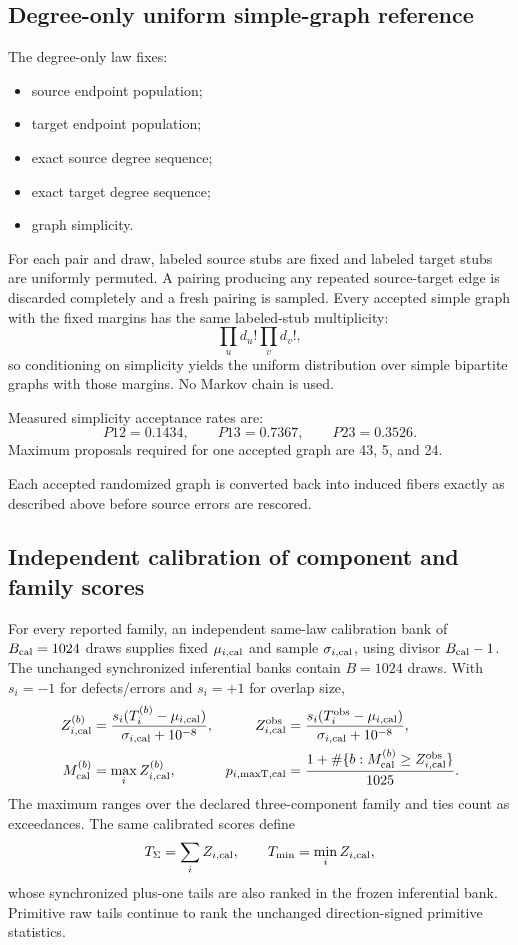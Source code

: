 \documentclass[11pt]{article}
\begin{document}
\subsection{Degree-only uniform simple-graph reference}

The degree-only law fixes:
\begin{itemize}[leftmargin=2em]
\item source endpoint population;
\item target endpoint population;
\item exact source degree sequence;
\item exact target degree sequence;
\item graph simplicity.
\end{itemize}

For each pair and draw, labeled source stubs are fixed and labeled target stubs are uniformly permuted. A pairing producing any repeated source-target edge is discarded completely and a fresh pairing is sampled. Every accepted simple graph with the fixed margins has the same labeled-stub multiplicity:
\[
\prod_u d_u!\prod_v d_v!,
\]
so conditioning on simplicity yields the uniform distribution over simple bipartite graphs with those margins. No Markov chain is used.

Measured simplicity acceptance rates are:
\[
P12=0.1434,\qquad
P13=0.7367,\qquad
P23=0.3526.
\]
Maximum proposals required for one accepted graph are 43, 5, and 24.

Each accepted randomized graph is converted back into induced fibers exactly as described above before source errors are rescored.

\subsection{Independent calibration of component and family scores}

For every reported family, an independent same-law calibration bank of \(B_{\rm cal}=1024\) draws supplies fixed \(\mu_{i,\rm cal}\) and sample \(\sigma_{i,\rm cal}\), using divisor \(B_{\rm cal}-1\). The unchanged synchronized inferential banks contain \(B=1024\) draws. With \(s_i=-1\) for defects/errors and \(s_i=+1\) for overlap size,
\begin{align}
Z_{i,\rm cal}^{(b)}
&=
\frac{s_i(T_i^{(b)}-\mu_{i,\rm cal})}
{\sigma_{i,\rm cal}+10^{-8}},
&
Z_{i,\rm cal}^{\rm obs}
&=
\frac{s_i(T_i^{\rm obs}-\mu_{i,\rm cal})}
{\sigma_{i,\rm cal}+10^{-8}},\\
M_{\rm cal}^{(b)}
&=
\max_i Z_{i,\rm cal}^{(b)},
&
p_{i,\rm maxT,cal}
&=
\frac{
1+\#\{b:M_{\rm cal}^{(b)}\ge Z_{i,\rm cal}^{\rm obs}\}
}{1025}.
\end{align}
The maximum ranges over the declared three-component family and ties count as exceedances. The same calibrated scores define
\[
T_\Sigma=\sum_i Z_{i,\rm cal},
\qquad
T_{\min}=\min_i Z_{i,\rm cal},
\]
whose synchronized plus-one tails are also ranked in the frozen inferential bank. Primitive raw tails continue to rank the unchanged direction-signed primitive statistics.
\end{document}
